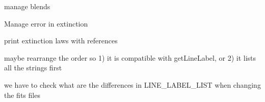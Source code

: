 
\begin{DoxyRefList}
\item[\label{todo__todo000002}%
\hypertarget{todo__todo000002}{}%
Member \hyperlink{classpyneb_1_1core_1_1pynebcore_1_1_atom_ad1d75f64b27a6acee079b5738b69dabe}{pyneb.core.pynebcore.Atom.\+\_\+get\+Tem\+Den\+\_\+1} ]manage blends  
\item[\label{todo__todo000004}%
\hypertarget{todo__todo000004}{}%
Member \hyperlink{classpyneb_1_1extinction_1_1red__corr_1_1_red_corr_a27b836e3bd87558f6156a8bf94fbf658}{pyneb.extinction.red\+\_\+corr.Red\+Corr.\+\_\+\+\_\+init\+\_\+\+\_\+} ]Manage error in extinction 

print extinction laws with references  
\item[\label{todo__todo000001}%
\hypertarget{todo__todo000001}{}%
Member \hyperlink{namespacepyneb_1_1core_1_1pynebcore_a9fa8b0b7efdd4da21a816641bf17dcc7}{pyneb\+:\+:core\+:\+:pynebcore.parse\+Line\+Label} (line\+Label)]maybe rearrange the order so 1) it is compatible with get\+Line\+Label, or 2) it lists all the strings first  
\item[\label{todo__todo000003}%
\hypertarget{todo__todo000003}{}%
Member \hyperlink{namespacepyneb_1_1utils_1_1init_a1d1830a7176a3f6e31326855475849a1}{pyneb\+:\+:utils\+:\+:init.\+\_\+print\+\_\+\+L\+I\+N\+E\+\_\+\+L\+A\+B\+E\+L\+\_\+\+L\+I\+S\+T} (args, kwargs)]we have to check what are the differences in L\+I\+N\+E\+\_\+\+L\+A\+B\+E\+L\+\_\+\+L\+I\+S\+T when changing the fits files 
\end{DoxyRefList}